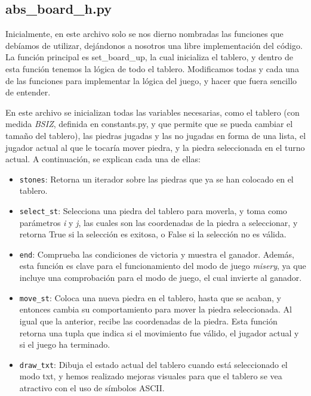 \documentclass[a4paper,12pt]{article}
\begin{document}
\subsection{abs\_board\_h.py}
Inicialmente, en este archivo solo se nos dierno nombradas las funciones que debíamos de utilizar, dejándonos a nosotros una libre 
implementación del código. La función principal es set\_board\_up, la cual inicializa el tablero, y dentro de esta función tenemos la
lógica de todo el tablero. Modificamos todas y cada una de las funciones para implementar la lógica del juego, y hacer que fuera sencillo 
de entender.

\vspace{\baselineskip}
En este archivo se inicializan todas las variables necesarias, como el tablero (con medida \textit{BSIZ}, definida en constants.py,
y que permite que se pueda cambiar el tamaño del tablero), las piedras jugadas y las no jugadas en forma de una lista, el jugador
actual al que le tocaría mover piedra, y la piedra seleccionada en el turno actual.
A continuación, se explican cada una de ellas:

\begin{itemize}
    \item \texttt{stones}: Retorna un iterador sobre las piedras que ya se han colocado en el tablero.
    \item \texttt{select\_st}: Selecciona una piedra del tablero para moverla, y toma como parámetros \textit{i} y \textit{j}, las
    cuales son las coordenadas de la piedra a seleccionar, y retorna True si la selección es exitosa, o False si la selección no es 
    válida.
    \item \texttt{end}: Comprueba las condiciones de victoria y muestra el ganador. Además, esta función es clave para el funcionamiento
    del modo de juego \textit{misery}, ya que incluye una comprobación para el modo de juego, el cual invierte al ganador.
    \item \texttt{move\_st}: Coloca una nueva piedra en el tablero, hasta que se acaban, y entonces cambia su comportamiento para mover la 
    piedra seleccionada. Al igual que la anterior, recibe las coordenadas de la piedra. Esta función retorna una tupla que indica si el movimiento
    fue válido, el jugador actual y si el juego ha terminado.
    \item \texttt{draw\_txt}: Dibuja el estado actual del tablero cuando está seleccionado el modo txt, y hemos realizado mejoras visuales para que 
    el tablero se vea atractivo con el uso de símbolos ASCII.\@
\end{itemize}
\end{document}

